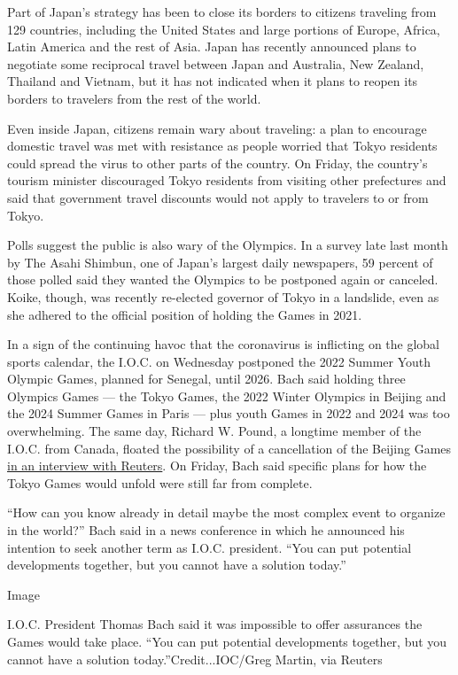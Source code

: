 Part of Japan's strategy has been to close its borders to citizens
traveling from 129 countries, including the United States and large
portions of Europe, Africa, Latin America and the rest of Asia. Japan
has recently announced plans to negotiate some reciprocal travel between
Japan and Australia, New Zealand, Thailand and Vietnam, but it has not
indicated when it plans to reopen its borders to travelers from the rest
of the world.

Even inside Japan, citizens remain wary about traveling: a plan to
encourage domestic travel was met with resistance as people worried that
Tokyo residents could spread the virus to other parts of the country. On
Friday, the country's tourism minister discouraged Tokyo residents from
visiting other prefectures and said that government travel discounts
would not apply to travelers to or from Tokyo.

Polls suggest the public is also wary of the Olympics. In a survey late
last month by The Asahi Shimbun, one of Japan's largest daily
newspapers, 59 percent of those polled said they wanted the Olympics to
be postponed again or canceled. Koike, though, was recently re-elected
governor of Tokyo in a landslide, even as she adhered to the official
position of holding the Games in 2021.

In a sign of the continuing havoc that the coronavirus is inflicting on
the global sports calendar, the I.O.C. on Wednesday postponed the 2022
Summer Youth Olympic Games, planned for Senegal, until 2026. Bach said
holding three Olympics Games --- the Tokyo Games, the 2022 Winter
Olympics in Beijing and the 2024 Summer Games in Paris --- plus youth
Games in 2022 and 2024 was too overwhelming. The same day, Richard W.
Pound, a longtime member of the I.O.C. from Canada, floated the
possibility of a cancellation of the Beijing Games
\href{https://www.reuters.com/article/us-olympics-beijing-pound-interview/olympics-no-tokyo-games-likely-means-no-beijing-either-says-pound-idUSKCN24G30L}{in
an interview with Reuters}. On Friday, Bach said specific plans for how
the Tokyo Games would unfold were still far from complete.

``How can you know already in detail maybe the most complex event to
organize in the world?'' Bach said in a news conference in which he
announced his intention to seek another term as I.O.C. president. ``You
can put potential developments together, but you cannot have a solution
today.''

Image

I.O.C. President Thomas Bach said it was impossible to offer assurances
the Games would take place. ``You can put potential developments
together, but you cannot have a solution today.''Credit...IOC/Greg
Martin, via Reuters

